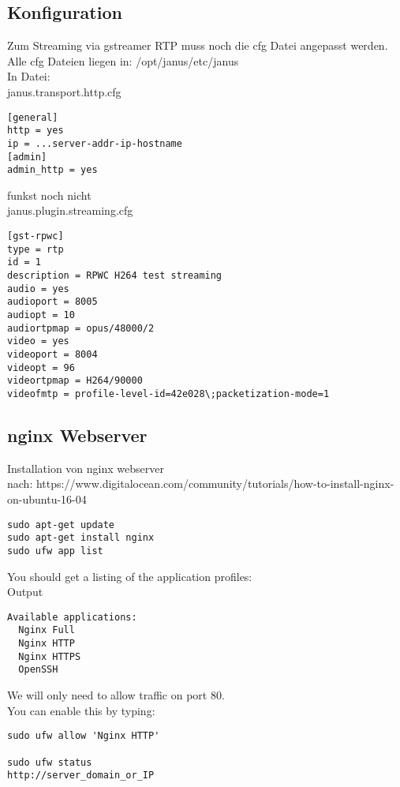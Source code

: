 \subsection{Konfiguration}
Zum Streaming via gstreamer RTP muss noch die cfg Datei angepasst werden.\\
Alle cfg Dateien liegen in: /opt/janus/etc/janus\\

In Datei:\\
janus.transport.http.cfg
\begin{verbatim}
[general]
http = yes
ip = ...server-addr-ip-hostname
[admin]
admin_http = yes
\end{verbatim}

funkst noch nicht\\
janus.plugin.streaming.cfg
\begin{verbatim}
[gst-rpwc]
type = rtp 
id = 1 
description = RPWC H264 test streaming 
audio = yes 
audioport = 8005 
audiopt = 10 
audiortpmap = opus/48000/2 
video = yes 
videoport = 8004 
videopt = 96 
videortpmap = H264/90000 
videofmtp = profile-level-id=42e028\;packetization-mode=1 
\end{verbatim}

\subsection{nginx Webserver}
Installation von nginx webserver\\

nach: https://www.digitalocean.com/community/tutorials/how-to-install-nginx-on-ubuntu-16-04
\begin{verbatim}
sudo apt-get update
sudo apt-get install nginx
sudo ufw app list
\end{verbatim}

You should get a listing of the application profiles:\\
Output
\begin{verbatim}
Available applications:
  Nginx Full
  Nginx HTTP
  Nginx HTTPS
  OpenSSH
\end{verbatim}

We will only need to allow traffic on port 80.\\
You can enable this by typing:
\begin{verbatim}
sudo ufw allow 'Nginx HTTP'

sudo ufw status
http://server_domain_or_IP
\end{verbatim}

